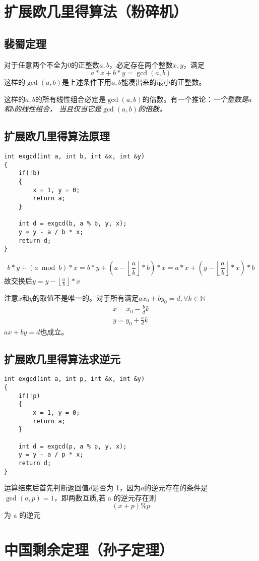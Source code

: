 \documentclass[]{book}
\begin{document}
\chapter{扩展欧几里得算法（粉碎机）}
\section{裴蜀定理}
对于任意两个不全为$0$的正整数$a,b$，必定存在两个整数$x,y$，满足
\[a * x + b * y = \gcd(a, b)\]
这样的$\gcd(a,b)$是上述条件下用$a,b$能凑出来的最小的正整数。

这样的$a,b$的所有线性组合必定是$\gcd(a,b)$的倍数。有一个推论：{\itshape 一个整数是$a$和$b$的线性组合，
当且仅当它是$\gcd(a,b)$的倍数。}
\section{扩展欧几里得算法原理}
\begin{lstlisting}
int exgcd(int a, int b, int &x, int &y)
{
    if(!b)
    {
        x = 1, y = 0;
        return a;
    }
    
    int d = exgcd(b, a % b, y, x);
    y = y - a / b * x;
    return d;
}
\end{lstlisting}
\[b*y + (a\bmod b)*x = b*y + (a-\left\lfloor \frac{a}{b}\right\rfloor * b)*x = a*x + (y - \left\lfloor \frac{a}{b}\right\rfloor *x)*b\]
故交换后$y = y - \left\lfloor \frac{a}{b}\right\rfloor * x$

注意$x$和$y$的取值不是唯一的。对于所有满足$ax_{0}+by_{0} = d,\forall k \in \mathbb{N}$
$$
\begin{matrix} 
    x=x_{0} - \frac{b}{d}k \\  
    y=y_{0} + \frac{a}{d}k 
\end{matrix}
$$
$ax+by=d$也成立。
\section{扩展欧几里得算法求逆元}
\begin{lstlisting}
int exgcd(int a, int p, int &x, int &y)
{
    if(!p)
    {
        x = 1, y = 0;
        return a;
    }
    
    int d = exgcd(p, a % p, y, x);
    y = y - a / p * x;
    return d;
}
\end{lstlisting}
运算结束后首先判断返回值$d$是否为 1，因为$a$的逆元存在的条件是 $\gcd(a, p) = 1$，即两数互质,若 a 的逆元存在则
\[(x + p) \% p\]
为 a 的逆元
\chapter{中国剩余定理（孙子定理）}
\end{document}
